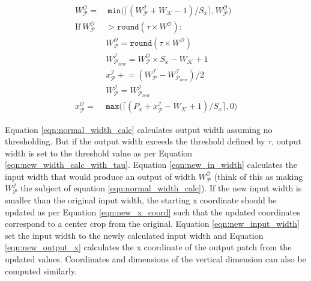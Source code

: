 \begin{align}
\label{eqn:normal_width_calc}
W^\mathcal{O}_\mathcal{P} = &~ \texttt{min}\big(\lceil (W^\mathcal{I}_\mathcal{P} + W_\mathcal{K} - 1)/S_x \rceil, W^\mathcal{O}_\mathcal{P}\big)\\
\label{eqn:check_tau}
\text{If}~ W_\mathcal{P}^\mathcal{O} & > \texttt{round}(\tau \times W^\mathcal{O}):\\
\label{eqn:new_width_calc_with_tau}
& W^\mathcal{O}_\mathcal{P} = \texttt{round}(\tau \times W^\mathcal{O})\\
\label{eqn:new_in_width}
& W^\mathcal{I}_{\mathcal{P}_{new}} = W^\mathcal{O}_{\mathcal{P}} \times S_x - W_{\mathcal{K}} + 1\\
\label{eqn:new_x_coord}
& x^{\mathcal{I}}_\mathcal{P} \mathrel{+}= (W^\mathcal{I}_\mathcal{P} - W^\mathcal{I}_{\mathcal{P}_{new}})/2\\
\label{eqn:new_input_width}
& W^\mathcal{I}_{\mathcal{P}} = W^\mathcal{I}_{\mathcal{P}_{new}}\\
\label{eqn:new_output_x}
x^\mathcal{O}_\mathcal{P} = & \texttt{max}\big(\lceil (P_x + x^\mathcal{I}_\mathcal{P} - W_\mathcal{K} + 1)/S_x \rceil, 0\big)
\end{align}

Equation \ref{eqn:normal_width_calc} calculates output width assuming no thresholding. But if the output width exceeds the threshold defined by $\tau$, output width is set to the threshold value as per Equation \ref{eqn:new_width_calc_with_tau}.
Equation \ref{eqn:new_in_width} calculates the input width that would produce an output of width $W^\mathcal{O}_\mathcal{P}$ (think of this as making $W^{\mathcal{I}}_{\mathcal{P}}$ the subject of equation \ref{eqn:normal_width_calc}).
If the new input width is smaller than the original input width, the starting x coordinate should be updated as per Equation \ref{eqn:new_x_coord} such that the updated coordinates correspond to a center crop from the original.
Equation \ref{eqn:new_input_width} set the input width to the newly calculated input width and Equation \ref{eqn:new_output_x} calculates the x coordinate of the output patch from the updated values.
Coordinates and dimensions of the vertical dimension can also be computed similarly.


